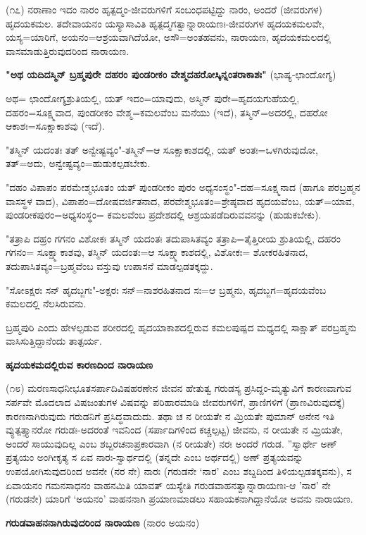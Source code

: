 (೧೭) ನರಾಣಾಂ ಇದಂ ನಾರಂ ಹೃತ್ಪದ್ಮಂ-ಜೀವರುಗಳಿಗೆ ಸಂಬಂಧಪಟ್ಟಿದ್ದು ನಾರಂ, ಅಂದರೆ (ಜೀವರುಗಳ) ಹೃದಯಕಮಲ. ತದೇವಾಯನಂ ಯಸ್ಯಾಸಾವಿತಿ ಹೃತ್ಪದ್ಮಗತ್ವಾನ್ನಾರಾಯಣಃ-ಜೀವರುಗಳ ಹೃದಯಕಮಲವೇ, ಯಸ್ಯ=ಯಾರಿಗೆ, ಅಯನಂ=ಆಶ್ರಯವಾಗಿದೆಯೋ, ಅಸೌ=ಅಂತಹವನು, ನಾರಾಯಣ, ಹೃದಯಕಮಲದಲ್ಲಿ ವಾಸಮಾಡುತ್ತಿರುವುದರಿಂದ ನಾರಾಯಣ.

\textbf{"ಅಥ ಯದಿದಸ್ಮಿನ್ ಬ್ರಹ್ಮಪುರೇ ದಹರಂ ಪುಂಡರೀಕಂ ವೇಶ್ಮದಹರೋಸ್ಕಿನ್ನಂತರಾಕಾಶಃ"} (ಭಾಷ್ಯ-ಛಾಂದೋಗ್ಯ)

ಅಥ= ಛಾಂದೋಗ್ಯಶ್ರುತಿಯಲ್ಲಿ, ಯತ್ ಇದಂ=ಯಾವುದು, ಅಸ್ಮಿನ್ ಪುರೇ=ಹೃದಯಗುಹೆಯಲ್ಲಿ, ದಹರಂ=ಸೂಕ್ಷ್ಮವಾದ, ಪುಂಡರೀಕಂ ವೇಶ್ಮ=ಕಮಲವೆಂಬ ಮನೆಯು (ಇದೆ), ತಸ್ಮಿನ್=ಅದರಲ್ಲಿ, ದಹರೋ ಆಕಾಶಃ=ಸೂಕ್ಷಾಕಾಶವು (ಇದೆ).

"ತಸ್ಮಿನ್ ಯದಂತಃ ತತ್ ಅನ್ವೇಷ್ಟವ್ಯಂ"-ತಸ್ಮಿನ್=ಆ ಸೂಕ್ಷಾಕಾಶದಲ್ಲಿ, ಯತ್ ಅಂತಃ=ಒಳಗಿರುವುದೋ, ತತ್=ಅದು, ಅನ್ವೇಷ್ಟವ್ಯಂ=ಹುಡುಕಲ್ಪಡಬೇಕು.

"ದಹಂ ವಿಪಾಪಂ ಪರಮೇಶ್ಮಭೂತಂ ಯತ್ ಪುಂಡರೀಕಂ ಪುರಂ ಅಧ್ಯಸಂಸ್ಥಂ"-ದಹ=ಸೂಕ್ಷ್ಮನಾದ (ಹಾಗೂ ಪರಬ್ರಹ್ಮನ ವಾಸಸ್ಥಳ ವಾದ), ವಿಪಾಪಂ=ದೋಷವರ್ಜಿತನಾದ, ಪರವೇಶ್ಮಭೂತಂ=ಶ್ರೇಷ್ಠವಾದ ಹೃದಯವೆಂಬ, ಯತ್=ಯಾವ, ಪುಂಡರೀಕಪುರಂ=ಅಧ್ಯಸಂಸ್ಥಂ= ಕಮಲವೆಂಬ ಪ್ರದೇಶದಲ್ಲಿ ಆಶ್ರಯಪಡೆದಿರುವವನನ್ನು (ಹುಡುಕಬೇಕು).

"ತತ್ರಾಪಿ ದಹ್ರಂ ಗಗನಂ ವಿಶೋಕಃ ತಸ್ಮಿನ್ ಯದಂತಃ ತದುಪಾಸಿತವ್ಯಂ ತತ್ರಾಪಿ=ತೈತ್ತಿರೀಯ ಶ್ರುತಿಯಲ್ಲಿ, ದಹರಂ ಗಗನಂ= ಸೂಕ್ಷ್ಮಾಕಾಶವು, ತಸ್ಮಿನ್ ಯದಂತಃ=ಆ ಸೂಕ್ಷ್ಮಾಕಾಶದಲ್ಲಿ, ವಿಶೋಕಃ= ಶೋಕರಹಿತನಾದ, ತದುಪಾಸಿತವ್ಯಂ=ಬ್ರಹ್ಮವೆಂಬ ವಸ್ತುವು ಉಪಾಸನೆ ಮಾಡಲ್ಪಡತಕ್ಕದ್ದು.

"ಸೋಽಕ್ಷರಃ ಸನ್ ಹೃದಬ್ಜಗಃ"-ಅಕ್ಷರಃ ಸನ್=ನಾಶರಹಿತನಾದ ಸಃ=ಆ ಬ್ರಹ್ಮನು, ಹೃದಬ್ಜಗ=ಹೃದಯವೆಂಬ ಕಮಲದಲ್ಲಿ ನೆಲಸಿರುವನು.

ಬ್ರಹ್ಮಪುರಿ ಎಂದು ಹೇಳಲ್ಪಡುವ ಶರೀರದಲ್ಲಿ ಹೃದಯಾಕಾಶದಲ್ಲಿರುವ ಕಮಲಪುಷ್ಪದ ಮಧ್ಯದಲ್ಲಿ ಸಾಕ್ಷಾತ್ ಪರಬ್ರಹ್ಮನು ವಾಸಿಸುತ್ತಿದ್ದಾನೆಂದು ತಾತ್ಪರ್ಯ.

\begin{center}
\textbf{ಹೃದಯಕಮದಲ್ಲಿರುವ ಕಾರಣದಿಂದ ನಾರಾಯಣ}
\end{center}

(೧೮) ಮರಣಸಾಧನೀಭೂತಸರ್ಪಾದಿವಿಷಹರಣೇನ ಜೀವನ ಹೇತುತ್ವ ಗರುಡಸ್ಯ ಪ್ರಸಿದ್ದಂ-ಮೃತ್ಯುವಿಗೆ ಕಾರಣವಾಗುವ ಸರ್ಪವೇ ಮೊದಲಾದ ವಿಷಜಂತುಗಳ ವಿಷವನ್ನು ಪರಿಹಾರಮಾಡಿ ಜೀವರುಗಳಿಗೆ, ಪ್ರಾಣಿಗಳಿಗೆ (ಪ್ರಾಣವಿರುವುದಕ್ಕೆ) ಕಾರಣನಾಗಿರುವುದು ಗರುಡನಿಗೆ ಪ್ರಸಿದ್ಧವಾದುದು. ತಥಾ ಚ ನ ರೀಯತೇ ನ ಮ್ರಿಯತೇ ಪುಮಾನ್ ಅನೇನ ಇತಿ ವ್ಯುತ್ಪತ್ತ್ಯಾನರೋ ಗರುಡಃ-ಅದರಂತೆ ಇವನಿಂದ (ಸರ್ಪಾದಿಗಳಿಂದ ಕಚ್ಚಲ್ಪಟ್ಟ) ಜೀವನು, ನ ರೀಯತೇ ನ ಮ್ರಿಯತೇ, ಅಂದರೆ ಸಾಯುವುದಿಲ್ಲ ಎಂಬ ಶಬ್ದರಚನಾಪ್ರಕಾರವಾಗಿ (ನ ರೀಯತೇ) ನರಃ ಅಂದರೆ ಗರುಡ. ''ಸ್ವಾರ್ಥೇ ಅಣ್ ಪ್ರತ್ಯಯಂ ಅಂಗೀಕೃತ್ಯ ಸ ಏವ ನಾರಃ-ಸ್ವಾರ್ಥದಲ್ಲಿ (ತನ್ನದೇ ಎಂಬ ಅರ್ಥದಲ್ಲಿ) ಅಣ್ ಪ್ರತ್ಯಯವನ್ನು ಉಪಯೋಗಿಸುವುದರಿಂದ ಅವನೇ (ನರ ನೇ) ನಾರಃ (ಗರುಡನೇ `ನಾರ' ಎಂಬ ಶಬ್ದದಿಂದ ತಿಳಿಯಲ್ಪಡತಕ್ಕವನು), ಸ ಏವಾಯನಂ ಗಮನಸಾಧನಂ ವಾಹನಮಿತಿ ಯಾವತ್‌ ಯಸ್ಯೇತಿ ಗರುಡವಾಹನತ್ವಾನ್ನಾರಾಯಣಃ-ಆ 'ನಾರ' ನೇ (ಗರುಡನೇ) ಯಾರಿಗೆ `ಅಯನಂ' ವಾಹನನಾಗಿ ಪ್ರಯಾಣಮಾಡಲು ಸಹಾಯಕನಾಗಿದ್ದಾನೆಯೋ ಅವನು ನಾರಾಯಣ.

\begin{center}
\textbf{ಗರುಡವಾಹನನಾಗಿರುವುದರಿಂದ ನಾರಾಯಣ} (ನಾರಂ ಅಯನಂ)
\end{center}

